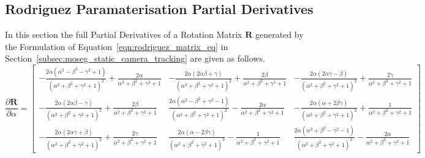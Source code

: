 \begin{landscape}
\subsection{Rodriguez Paramaterisation Partial Derivatives}
In this section the full Partial Derivatives of a Rotation Matrix \(\bm{R}\)
generated by the Formulation of Equation~\ref{eqn:rodriguez_matrix_eq} in
Section~\ref{subsec:moseg_static_camera_tracking} are given as follows.
\begin{equation}
  \label{eqn:rodrigues_full_alpha_deriv}
  \frac{\partial \bm{R}}{\partial \alpha} =
    \begin{bmatrix}
      - \frac{2 \alpha \left(\alpha^{2} - \beta^{2} - \gamma^{2} +
          1\right)}{{\left(\alpha^{2} + \beta^{2} + \gamma^{2} + 1\right)}^{2}} +
      \frac{2 \alpha}{\alpha^{2} + \beta^{2} + \gamma^{2} + 1} &
      - \frac{2 \alpha \left(2 \alpha \beta + \gamma\right)}{{\left(\alpha^{2} +
          \beta^{2} + \gamma^{2} + 1\right)}^{2}} + \frac{2 \beta}{\alpha^{2} +
        \beta^{2} + \gamma^{2} + 1} &
      - \frac{2 \alpha \left(2 \alpha \gamma - \beta\right)}{{{\left(\alpha^{2} +
          \beta^{2} + \gamma^{2} + 1\right)}}^{2}}
      + \frac{2 \gamma}{\alpha^{2} + \beta^{2} + \gamma^{2} + 1}\\
      -\frac{2 \alpha \left(2 \alpha \beta - \gamma\right)}{{\left(\alpha^{2} +
          \beta^{2} + \gamma^{2} + 1\right)}^{2}} + \frac{2 \beta}{\alpha^{2} +
        \beta^{2} + \gamma^{2} + 1} &
      \frac{2 \alpha \left(\alpha^{2} - \beta^{2} + \gamma^{2} - 1\right)}
      {{\left(\alpha^{2} + \beta^{2} + \gamma^{2} + 1\right)}^{2}} - \frac{2 \alpha}
      {\alpha^{2} + \beta^{2} + \gamma^{2} + 1} &
      - \frac{2 \alpha \left(\alpha + 2 \beta \gamma\right)}
      {{\left(\alpha^{2} + \beta^{2} + \gamma^{2} + 1\right)}^{2}} +
      \frac{1}{\alpha^{2} + \beta^{2} + \gamma^{2} + 1}\\
      - \frac{2 \alpha \left(2 \alpha \gamma + \beta\right)}{{\left(\alpha^{2} +
          \beta^{2} + \gamma^{2} + 1\right)}^{2}} + \frac{2 \gamma}{\alpha^{2} +
        \beta^{2} + \gamma^{2} + 1} &
      \frac{2 \alpha \left(\alpha - 2 \beta \gamma\right)}
      {{\left(\alpha^{2} + \beta^{2} + \gamma^{2} + 1\right)}^{2}} -
      \frac{1}{\alpha^{2} + \beta^{2} + \gamma^{2} + 1} &
      \frac{2 \alpha \left(\alpha^{2} + \beta^{2} - \gamma^{2} - 1\right)}
      {{\left(\alpha^{2} + \beta^{2} + \gamma^{2} + 1\right)}^{2}} - \frac{2 \alpha}
      {\alpha^{2} + \beta^{2} + \gamma^{2} + 1}
    \end{bmatrix}
\end{equation}


\end{landscape}
